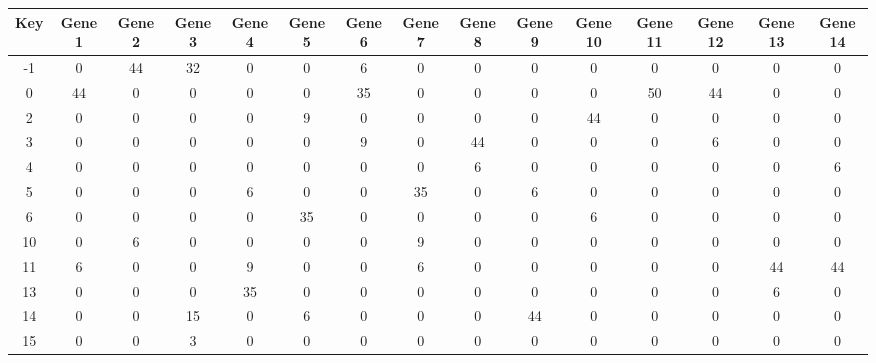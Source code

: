 \begin{tabular}{|c|c|c|c|c|c|c|c|c|c|c|c|c|c|c|}
\hline
Key & Gene 1 & Gene 2 & Gene 3 & Gene 4 & Gene 5 & Gene 6 & Gene 7 & Gene 8 & Gene 9 & Gene 10 & Gene 11 & Gene 12 & Gene 13 & Gene 14 \\
\hline
-1 & 0 & 44 & 32 & 0 & 0 & 6 & 0 & 0 & 0 & 0 & 0 & 0 & 0 & 0 \\
0 & 44 & 0 & 0 & 0 & 0 & 35 & 0 & 0 & 0 & 0 & 50 & 44 & 0 & 0 \\
2 & 0 & 0 & 0 & 0 & 9 & 0 & 0 & 0 & 0 & 44 & 0 & 0 & 0 & 0 \\
3 & 0 & 0 & 0 & 0 & 0 & 9 & 0 & 44 & 0 & 0 & 0 & 6 & 0 & 0 \\
4 & 0 & 0 & 0 & 0 & 0 & 0 & 0 & 6 & 0 & 0 & 0 & 0 & 0 & 6 \\
5 & 0 & 0 & 0 & 6 & 0 & 0 & 35 & 0 & 6 & 0 & 0 & 0 & 0 & 0 \\
6 & 0 & 0 & 0 & 0 & 35 & 0 & 0 & 0 & 0 & 6 & 0 & 0 & 0 & 0 \\
10 & 0 & 6 & 0 & 0 & 0 & 0 & 9 & 0 & 0 & 0 & 0 & 0 & 0 & 0 \\
11 & 6 & 0 & 0 & 9 & 0 & 0 & 6 & 0 & 0 & 0 & 0 & 0 & 44 & 44 \\
13 & 0 & 0 & 0 & 35 & 0 & 0 & 0 & 0 & 0 & 0 & 0 & 0 & 6 & 0 \\
14 & 0 & 0 & 15 & 0 & 6 & 0 & 0 & 0 & 44 & 0 & 0 & 0 & 0 & 0 \\
15 & 0 & 0 & 3 & 0 & 0 & 0 & 0 & 0 & 0 & 0 & 0 & 0 & 0 & 0 \\
\hline
\end{tabular}
